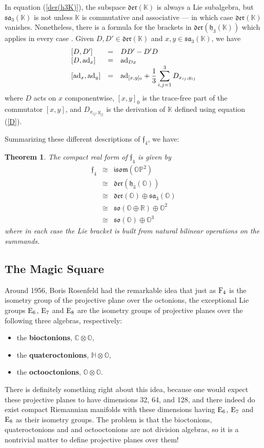 \documentclass[12pt]{article}
\newcommand\R{{\mathbb R}}
\newcommand\C{{\mathbb C}}
\renewcommand\H{{\mathbb H}}
\newcommand\K{{\mathbb K}}
\renewcommand\O{{\mathbb O}}
\newcommand\OP{{\mathbb {OP}}}
\newcommand{\E}{{\rm E}}
\newcommand{\F}{{\rm F}}
\newcommand{\so}{{\mathfrak {so}}}
\newcommand{\f}{{\mathfrak {f}}}
\newcommand{\sa}{{\mathfrak {sa}}}
\newcommand{\h}{{\mathfrak {h}}}
\newcommand{\isom}{{\mathfrak {isom}}}
\newcommand{\Der}{{\mathfrak {der}}}
\newcommand{\et}{\hspace{-0.08in}{\bf .}\hspace{0.1in}}
\newcommand{\tensor}{\otimes}
\newcommand{\iso}{\cong}
\newcommand{\be}{\begin{equation}}
\newcommand{\ee}{\end{equation}}
\newcommand{\ban}{\begin{eqnarray*}}
\newcommand{\ean}{\end{eqnarray*}}
\newcommand{\ad}{{\rm ad}}
\newtheorem{thm}{Theorem}
\begin{document}
In equation (\ref{der(h3K)}), the subspace $\Der(\K)$ is always a Lie
subalgebra, but $\sa_3(\K)$ is not unless $\K$ is commutative and
associative --- in which case $\Der(\K)$ vanishes.  Nonetheless, there
is a formula for the brackets in $\Der(\h_3(\K))$ which applies in every
case \cite{OV}.  Given $D,D' \in \Der(\K)$ and $x,y \in \sa_3(\K)$, we
have
\be
\begin{array}{lcl}
            [D,D'] &=& DD' - D'D   \cr
         [D,\ad_x] &=& \ad_{Dx}    \cr
     [\ad_x,\ad_y] &=& \ad_{[x,y]_0} + 
\displaystyle{{1\over 3} \sum_{i,j = 1}^3   D_{x_{ij},y_{ij}}  }
\end{array} 
\label{der(h3K)-bracket}
\ee
where $D$ acts on $x$ componentwise, $[x,y]_0$ is the trace-free   
part of the commutator $[x,y]$, and $D_{x_{ij},y_{ij}}$ is the
derivation of $\K$ defined using equation (\ref{D}).  
   
Summarizing these different descriptions of $\f_4$, we have:   
\begin{thm} \et \label{f4-description}  The compact real form of    
$\f_4$ is given by    
\ban   \f_4 &\iso& \isom(\OP^2)  \\   
            &\iso& \Der(\h_3(\O)) \\   
            &\iso& \Der(\O) \oplus \sa_3(\O) \\   
            &\iso& \so(\O \oplus \R) \oplus \O^2 \\   
            &\iso& \so(\O) \oplus \O^3   
\ean   
where in each case the Lie bracket is built from    
natural bilinear operations on the summands.     
\end{thm}   

\subsection{The Magic Square}  \label{magic}   
   
Around 1956, Boris Rosenfeld \cite{Rosenfeld1} had the remarkable idea
that just as $\F_4$ is the isometry group of the projective plane over
the octonions, the exceptional Lie groups $\E_6$, $\E_7$ and $\E_8$ are
the isometry groups of projective planes over the following three
algebras, respectively:
\begin{itemize}
\item the {\bf bioctonions}, $\C \tensor \O$,
\item the {\bf quateroctonions}, $\H \tensor \O$,
\item the {\bf octooctonions}, $\O \tensor \O$.
\end{itemize}
There is definitely something right about this idea, because one would
expect these projective planes to have dimensions 32, 64, and 128, and
there indeed do exist compact Riemannian manifolds with these
dimensions having $\E_6$, $\E_7$ and $\E_8$ as their isometry groups. 
The problem is that the bioctonions, quateroctonions and and
octooctonions are not division algebras, so it is a nontrivial matter to
define projective planes over them!
\end{document}
